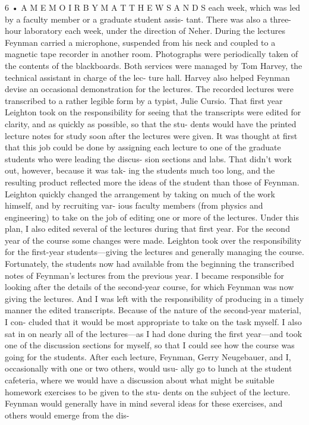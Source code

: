 \documentclass[11pt,oneside]{article}
\begin{document}
6 • A  M E M O I R  B Y  M A T T H E W  S A N D S each week, which was led by a faculty member or a graduate student assis- tant. There was also a three-hour laboratory each week, under the direction of Neher. During the lectures Feynman carried a microphone, suspended from his neck and coupled to a magnetic tape recorder in another room. Photographs were periodically taken of the contents of the blackboards. Both services were managed by Tom Harvey, the technical assistant in charge of the lec- ture hall. Harvey also helped Feynman devise an occasional demonstration for the lectures. The recorded lectures were transcribed to a rather legible form by a typist, Julie Cursio. That first year Leighton took on the responsibility for seeing that the transcripts were edited for clarity, and as quickly as possible, so that the stu- dents would have the printed lecture notes for study soon after the lectures were given. It was thought at first that this job could be done by assigning each lecture to one of the graduate students who were leading the discus- sion sections and labs. That didn’t work out, however, because it was tak- ing the students much too long, and the resulting product reflected more the ideas of the student than those of Feynman. Leighton quickly changed the arrangement by taking on much of the work himself, and by recruiting var- ious faculty members (from physics and engineering) to take on the job of editing one or more of the lectures. Under this plan, I also edited several of the lectures during that first year. For the second year of the course some changes were made. Leighton took over the responsibility for the first-year students---giving the lectures and generally managing the course. Fortunately, the students now had available from the beginning the transcribed notes of Feynman’s lectures from the previous year. I became responsible for looking after the details of the second-year course, for which Feynman was now giving the lectures. And I was left with the responsibility of producing in a timely manner the edited transcripts. Because of the nature of the second-year material, I con- cluded that it would be most appropriate to take on the task myself. I also sat in on nearly all of the lectures---as I had done during the first year---and took one of the discussion sections for myself, so that I could see how the course was going for the students. After each lecture, Feynman, Gerry Neugebauer, and I, occasionally with one or two others, would usu- ally go to lunch at the student cafeteria, where we would have a discussion about what might be suitable homework exercises to be given to the stu- dents on the subject of the lecture. Feynman would generally have in mind several ideas for these exercises, and others would emerge from the dis-\par
\end{document}
